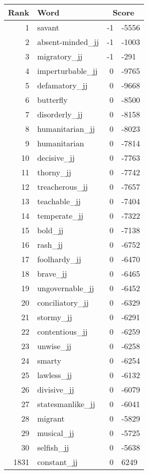 \begin{longtable}[!htbp]{| rlr@{.}l |}
    \hline
    \textbf{Rank} & \textbf{Word} & \multicolumn{2}{c|}{\textbf{Score}} \\
    \hline
    \endhead
    1 & savant & -1 & -5556 \\
    2 & absent-minded\_jj & -1 & -1003 \\
    3 & migratory\_jj & -1 & -291 \\
    4 & imperturbable\_jj & 0 & -9765 \\
    5 & defamatory\_jj & 0 & -9668 \\
    6 & butterfly & 0 & -8500 \\
    7 & disorderly\_jj & 0 & -8158 \\
    8 & humanitarian\_jj & 0 & -8023 \\
    9 & humanitarian & 0 & -7814 \\
    10 & decisive\_jj & 0 & -7763 \\
    11 & thorny\_jj & 0 & -7742 \\
    12 & treacherous\_jj & 0 & -7657 \\
    13 & teachable\_jj & 0 & -7404 \\
    14 & temperate\_jj & 0 & -7322 \\
    15 & bold\_jj & 0 & -7138 \\
    16 & rash\_jj & 0 & -6752 \\
    17 & foolhardy\_jj & 0 & -6470 \\
    18 & brave\_jj & 0 & -6465 \\
    19 & ungovernable\_jj & 0 & -6452 \\
    20 & conciliatory\_jj & 0 & -6329 \\
    21 & stormy\_jj & 0 & -6291 \\
    22 & contentious\_jj & 0 & -6259 \\
    23 & unwise\_jj & 0 & -6258 \\
    24 & smarty & 0 & -6254 \\
    25 & lawless\_jj & 0 & -6132 \\
    26 & divisive\_jj & 0 & -6079 \\
    27 & statesmanlike\_jj & 0 & -6041 \\
    28 & migrant & 0 & -5829 \\
    29 & musical\_jj & 0 & -5725 \\
    30 & selfish\_jj & 0 & -5638 \\
    1831 & constant\_jj & 0 & 6249 \\

\end{longtable}
